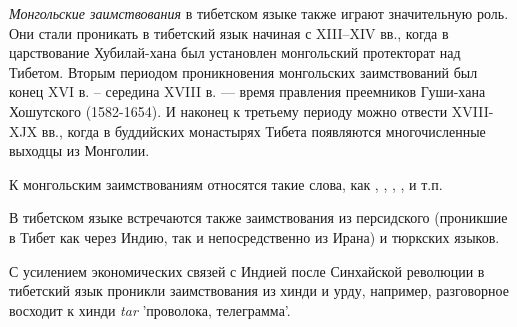 \emph{Монгольские заимствования} в тибетском языке также играют значительную роль. Они стали проникать в тибетский язык начиная с XIII--XIV вв., когда в царствование Хубилай-хана был установлен монгольский протекторат над Тибетом. Вторым периодом проникновения монгольских заимствований был конец XVI в. -- середина XVIII в. --- время правления преемников Гуши-хана Хошутского (1582-1654). И наконец к третьему периоду можно отвести XVIII-XJX вв., когда в буддийских монастырях Тибета появляются многочисленные выходцы из Монголии.

К монгольским заимствованиям относятся такие слова, как	, , , ,  и т.п.

В тибетском языке встречаются также заимствования из персидского (проникшие в Тибет как через Индию, так и непосредственно из Ирана) и тюркских языков.

С усилением экономических связей с Индией после Синхайской революции в тибетский язык проникли заимствования из хинди и урду, например, разговорное  восходит к хинди \textit{tar} 'проволока, телеграмма'.
